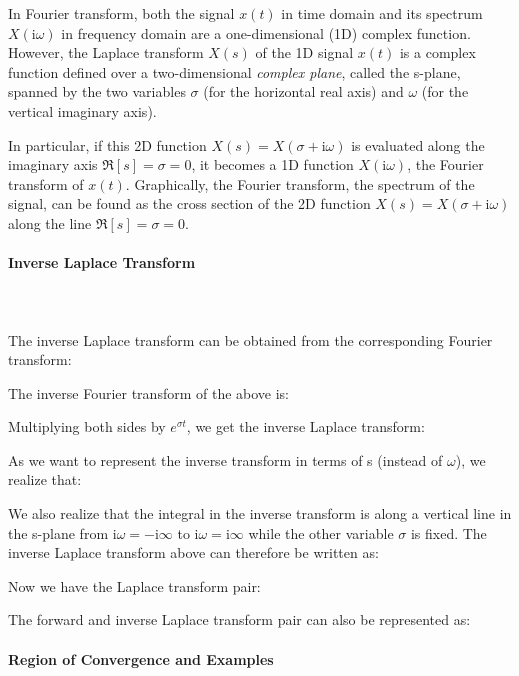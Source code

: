 	In Fourier transform, both the signal $x(t)$ in time domain and its spectrum 
	$X(\mathrm{i}\omega)$ in frequency domain are a one-dimensional (1D) complex function.
	However, the Laplace transform $X(s)$ of the 1D signal $x(t)$ is a complex 
	function defined over a two-dimensional {\em complex plane}, called the s-plane,
	spanned by the two variables $\sigma$ (for the horizontal real axis) and 
	$\omega$ (for the vertical imaginary axis). 
	
	In particular, if this 2D function $X(s)=X(\sigma+\mathrm{i}\omega)$ is evaluated along
	the imaginary axis $\Re[s]=\sigma=0$, it becomes a 1D function $X(\mathrm{i}\omega)$, the
	Fourier transform of $x(t)$. Graphically, the Fourier transform, the spectrum 
	of the signal, can be found as the cross section of the 2D function 
	$X(s)=X(\sigma+\mathrm{i}\omega)$ along the line $\Re[s]=\sigma=0$.
	
	
	\paragraph{Inverse Laplace Transform}\mbox{}\\\\
	
	The inverse Laplace transform can be obtained from the corresponding Fourier
	transform:
	
	The inverse Fourier transform of the above is:
	
	Multiplying both sides by $e^{\sigma t}$, we get the inverse Laplace transform:
	
	As we want to represent the inverse transform in terms of s (instead of $\omega$),
	we realize that:
	
	We also realize that the integral in the inverse transform is along a vertical
	line in the s-plane from $\mathrm{i}\omega=-\mathrm{i}\infty$ to $\mathrm{i}\omega=\mathrm{i}\infty$ while the other
	variable $\sigma$ is fixed. The inverse Laplace transform above can therefore be
	written as:
	
	Now we have the Laplace transform pair:
	
	
	The forward and inverse Laplace transform pair can also be represented as:
	
	
	
	\paragraph{Region of Convergence and Examples}\mbox{}\\\\
	
